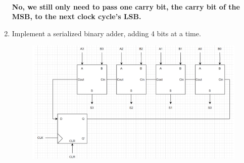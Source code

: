 \documentclass{article}
\begin{document}
\begin{enumerate}[label=\alph*.]
    \\ \textbf{No, we still only need to pass one carry bit, the carry bit of the MSB, to the next clock cycle’s LSB.}
    \newpage
    \item Implement a serialized binary adder, adding 4 bits at a time.
    \begin{figure}[!h]
        \centering
        \includegraphics[width=1.1\textwidth]{figures/serial1e_solution.png}
    \end{figure}
\end{enumerate}
\end{document}

